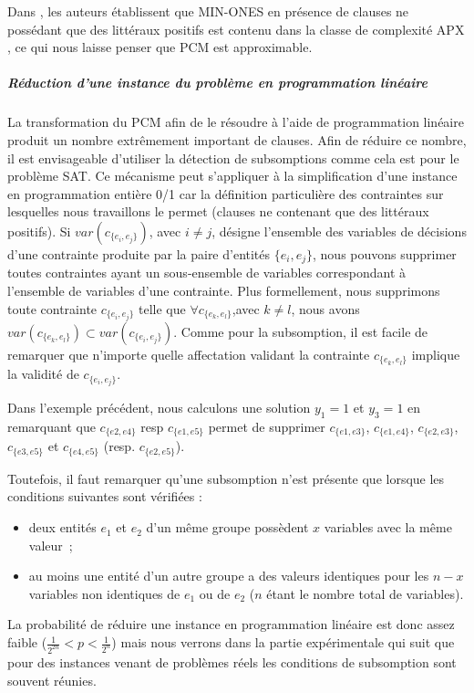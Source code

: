\documentclass[a4paper,10pt]{article}
\begin{document}
Dans \cite{creignou2001complexity}, les auteurs établissent que  MIN-ONES en
présence de clauses ne possédant que des littéraux positifs est contenu dans la
classe de complexité APX \cite{PapadimitriouY91}, ce qui nous laisse penser
que PCM est approximable.

\subparagraph{Réduction d'une instance du problème en programmation linéaire}
\label{sec::reduc}

La transformation du PCM afin de le résoudre à l'aide de programmation linéaire
produit un nombre extrêmement important de clauses. Afin de réduire ce nombre, il
est envisageable d'utiliser la détection de subsomptions \cite{sub} comme cela
est pour le problème SAT. Ce mécanisme peut s'appliquer à
la simplification d'une instance en programmation entière 0/1 car la définition
particulière des contraintes sur lesquelles nous travaillons le permet
(clauses ne contenant que des littéraux positifs). Si
$var(c_{\{e_i,e_j\}})$, avec $i \neq j$, désigne l'ensemble des variables de
décisions d'une contrainte  produite par la paire d'entités $\{e_i,e_j\}$, nous
pouvons supprimer toutes contraintes ayant un sous-ensemble de variables
correspondant à l'ensemble de variables d'une contrainte. Plus formellement,
nous supprimons toute contrainte $c_{\{e_i,e_j\}}$ telle que $\forall
c_{\{e_k,e_l\}}$,avec $k \neq l$, nous avons  $var(c_{\{e_k,e_l\}})\subset
var(c_{\{e_i,e_j\}})$. Comme pour la
subsomption, il est facile de remarquer que n'importe quelle affectation
validant la contrainte $c_{\{e_k,e_l\}}$ implique la validité de
$c_{\{e_i,e_j\}}$.

Dans l'exemple précédent, nous calculons une solution $y_1=1$ et $y_3=1$
en remarquant que $c_{\{e2,e4\}}$ {resp $c_{\{e1,e5\}}$}  permet de supprimer
$c_{\{e1,e3\}}$, $c_{\{e1,e4\}}$, $c_{\{e2,e3\}}$, $c_{\{e3,e5\}}$ et
$c_{\{e4,e5\}}$ (resp. $c_{\{e2,e5\}}$).

Toutefois, il faut remarquer qu'une subsomption n'est présente que lorsque les conditions suivantes sont vérifiées :
\begin{itemize}
\item deux entités $e_1$ et $e_2$ d'un même groupe possèdent $x$ variables avec la même valeur~;
\item au moins une entité d'un autre groupe a des valeurs identiques pour les $n-x$ variables non identiques de  $e_1$ ou de $e_2$ ($n$ étant le nombre total de variables).
\end{itemize}

La probabilité de réduire une instance en programmation linéaire est donc assez faible ($\frac{1}{2^{2n}}<p<\frac{1}{2^{n}}$) mais nous verrons dans la partie expérimentale qui suit que pour des instances venant de problèmes réels les conditions de subsomption sont souvent réunies.
\end{document}
